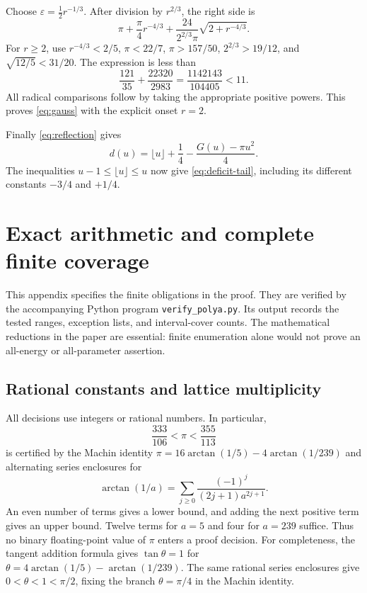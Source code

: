\documentclass[11pt,reqno]{amsart}
\numberwithin{equation}{section}
\begin{document}
Choose $\varepsilon=\tfrac12r^{-1/3}$. After division by
$r^{2/3}$, the right side is
\[
 \pi+\frac\pi4r^{-4/3}
 +\frac{24}{2^{2/3}\pi}\sqrt{2+r^{-4/3}}.
\]
For $r\ge2$, use $r^{-4/3}<2/5$, $\pi<22/7$,
$\pi>157/50$, $2^{2/3}>19/12$, and
$\sqrt{12/5}<31/20$. The expression is less than
\begin{equation}\label{eq:gauss-constant}
 \frac{121}{35}+\frac{22320}{2983}
 =\frac{1142143}{104405}<11.
\end{equation}
All radical comparisons follow by taking the appropriate
positive powers. This proves \eqref{eq:gauss} with the
explicit onset $r=2$.

Finally \eqref{eq:reflection} gives
\[
 d(u)=\lfloor u\rfloor+\frac14
             -\frac{G(u)-\pi u^2}{4}.
\]
The inequalities $u-1\le\lfloor u\rfloor\le u$ now give
\eqref{eq:deficit-tail}, including its different constants
$-3/4$ and $+1/4$.

\section{Exact arithmetic and complete finite coverage}\label{app:certificate}

This appendix specifies the finite obligations in the proof.
They are verified by the accompanying Python program
\texttt{verify\_polya.py}. Its output records
the tested ranges, exception lists, and interval-cover counts.
The mathematical reductions in the paper are essential:
finite enumeration alone would not prove an all-energy or
all-parameter assertion.

\subsection*{Rational constants and lattice multiplicity}

All decisions use integers or rational numbers. In particular,
\begin{equation}\label{eq:pi-bracket}
 \frac{333}{106}<\pi<\frac{355}{113}
\end{equation}
is certified by the Machin identity
$\pi=16\arctan(1/5)-4\arctan(1/239)$ and alternating
series enclosures for
\[
 \arctan(1/a)=\sum_{j\ge0}\frac{(-1)^j}{(2j+1)a^{2j+1}}.
\]
An even number of terms gives a lower bound, and adding
the next positive term gives an upper bound. Twelve terms
for $a=5$ and four for $a=239$ suffice. Thus no binary
floating-point value of $\pi$ enters a proof decision.
For completeness, the tangent addition formula gives
$\tan\theta=1$ for
$\theta=4\arctan(1/5)-\arctan(1/239)$. The same rational
series enclosures give $0<\theta<1<\pi/2$, fixing the
branch $\theta=\pi/4$ in the Machin identity.
\end{document}
